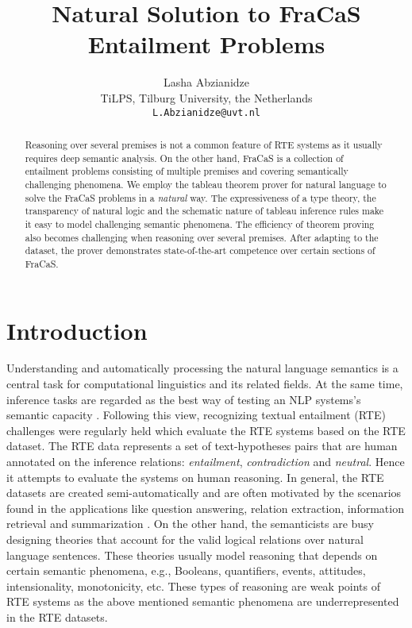 \documentclass[11pt]{article}
\title{Natural Solution to FraCaS Entailment Problems}
\author{Lasha Abzianidze \\
  TiLPS, Tilburg University, the Netherlands \\
  {\tt L.Abzianidze@uvt.nl}}
\date{}
\begin{document}
\maketitle


\begin{abstract}
Reasoning over several premises is not a common feature of RTE systems as it usually requires deep semantic analysis.
On the other hand, FraCaS is a collection of entailment problems consisting of multiple premises and covering semantically challenging phenomena.
We employ the tableau theorem prover for natural language to solve the FraCaS problems in a {\em natural} way.
The expressiveness of a type theory, the transparency of natural logic and the schematic nature of tableau inference rules make it easy to model challenging semantic phenomena.  
The efficiency of theorem proving also becomes challenging when reasoning over several premises.
After adapting to the dataset, the prover demonstrates state-of-the-art competence over certain sections of FraCaS. 
\end{abstract}

\section{Introduction}

Understanding and automatically processing the natural language semantics is a central task for computational linguistics and its related fields. 
At the same time, inference tasks are regarded as the best way of testing an NLP systems's semantic capacity \cite[p. 63]{fracas}.
Following this view, recognizing textual entailment (RTE) challenges \cite{Dagan:2005} were regularly held which evaluate the RTE systems based on the RTE dataset.
The RTE data represents a set of text-hypotheses pairs that are human annotated on the inference relations: {\em entailment}, {\em contradiction} and {\em neutral}.
Hence it attempts to evaluate the systems on human reasoning.
In general, the RTE datasets are created semi-automatically and are often motivated by the scenarios found in the applications like question answering, relation extraction, information retrieval and summarization \cite{Dagan:2005,rteBook:2013}.
On the other hand, the semanticists are busy designing theories that account for the valid logical relations over natural language sentences.
These theories usually model reasoning that depends on certain semantic phenomena, e.g., Booleans, quantifiers, events, attitudes, intensionality, monotonicity, etc.
These types of reasoning are weak points of RTE systems as the above mentioned semantic phenomena are underrepresented in the RTE datasets. 
\end{document}
